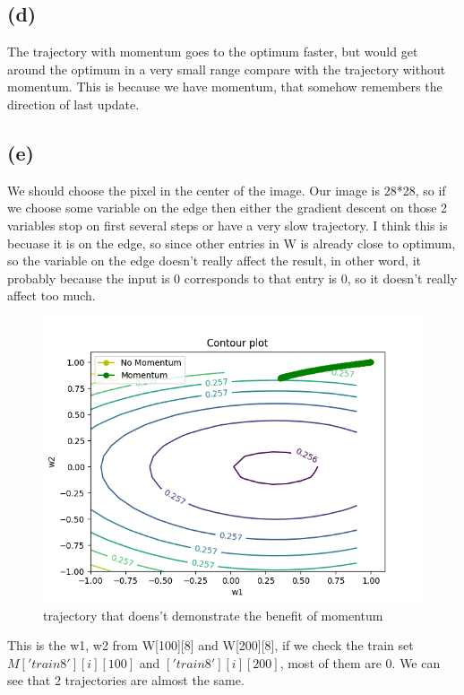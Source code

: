\documentclass[12pt]{article}
\begin{document}
\subsection*{(d)}
The trajectory with momentum goes to the optimum faster, but would get around the optimum in a very small range compare with the trajectory without momentum. This is because we have momentum, that somehow remembers the direction of last update.

\subsection*{(e)}
We should choose the pixel in the center of the image. Our image is 28*28, so if we choose some variable on the edge then either the gradient descent on those 2 variables stop on first several steps or have a very slow trajectory. I think this is becuase it is on the edge, so since other entries in W is already close to optimum, so the variable on the edge doesn't really affect the result, in other word, it probably because the input is 0 corresponds to that entry is 0, so it doesn't really affect too much.

\begin{figure}[H]
    \includegraphics[width=\textwidth]{./report/partbc_contour_bad.png}
    \caption{trajectory that doens't demonstrate the benefit of momentum}
\end{figure}

This is the w1, w2 from W[100][8] and W[200][8], if we check the train set $M['train8'][i][100]$ and $['train8'][i][200]$, most of them are 0. We can see that 2 trajectories are almost the same.
\end{document}
